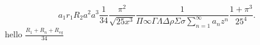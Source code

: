 
	\[
	a_1 r_1R_2a^2a^{3}\frac{1}{34} \frac{\pi^2}{\sqrt{25x^3} }
	\frac{1}{\Pi \infty \Gamma \Lambda \Delta \rho \Sigma \sigma \sum_{n=1}^{\infty} a_n z^n}
	\frac{1 + \pi^3}{25^{4}}
	.\] 
	hello
	$\frac{R_1 +R_n + R_{eq}}{34}$

